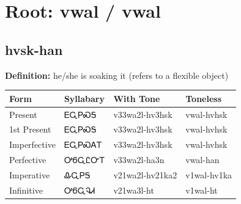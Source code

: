 \documentclass{article}%
\begin{document}
%
\normalsize%
\section*{Root: vwal / vwal}%
\subsection*{hvsk-han}%
\textbf{Definition: }%
he/she is soaking it (refers to a flexible object)%
\\[0.5em]%
\begin{tabular}{|l|l|l|l|}%
\hline%
\textbf{Form}&\textbf{Syllabary}&\textbf{With Tone}&\textbf{Toneless}\\%
\hline%
Present&ᎬᏩᏢᏍᎦ&v33wa2l{-}hv3hsk&vwal{-}hvhsk\\%
1st Present&ᎬᏩᏢᏍᎦ&v33wa2l{-}hv3hsk&vwal{-}hvhsk\\%
Imperfective&ᎬᏩᏢᏍᎪᎢ&v33wa2l{-}hv3hsk&vwal{-}hvhsk\\%
Perfective&ᎤᏮᏩᏝᏅᎢ&v33wa2l{-}ha3n&vwal{-}han\\%
Imperative&ᎲᏩᏢᎦ&v21wa2l{-}hv21ka2&v1wal{-}hv1ka\\%
Infinitive&ᎤᏮᏩᎸᏗ&v21wa3l{-}ht&v1wal{-}ht\\%
\hline%
\end{tabular}%
\\[1em]%
\end{document}
